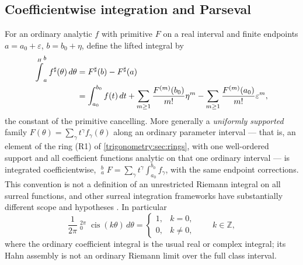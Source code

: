 \documentclass[11pt,letterpaper]{article}
\numberwithin{equation}{section}
\theoremstyle{definition}
\theoremstyle{remark}
\newcommand{\Z}{\mathbb Z}
\newcommand{\eps}{\varepsilon}
\newcommand{\cis}{\operatorname{cis}}
\newcommand{\sh}{^{\sharp}}
\newcommand{\HInt}{\mathop{\overset{\scriptscriptstyle H}{\int}}\nolimits}
\begin{document}
\subsection{Coefficientwise integration and Parseval}
For an ordinary analytic $f$ with primitive $F$ on a real interval and finite endpoints
$a=a_0+\eps$, $b=b_0+\eta$, define the lifted integral by
\begin{align}
 \HInt_a^bf\sh(\theta)\,d\theta
 &=F\sh(b)-F\sh(a)\label{trigonometry:eq:endpointintegral}\\
 &=\int_{a_0}^{b_0}f(t)\,dt
 +\sum_{m\ge1}\frac{F^{(m)}(b_0)}{m!}\eta^m
 -\sum_{m\ge1}\frac{F^{(m)}(a_0)}{m!}\eps^m,\notag
\end{align}
the constant of the primitive cancelling. More generally a \emph{uniformly supported} family
$F(\theta)=\sum_\gamma t^\gamma f_\gamma(\theta)$ along an ordinary parameter interval --- that is,
an element of the ring (R1) of \cref{trigonometry:sec:rings}, with one well-ordered support and all
coefficient functions analytic on that one ordinary interval --- is integrated coefficientwise,
$\HInt_a^bF=\sum_\gamma t^\gamma\int_{a_0}^{b_0}f_\gamma$, with the same endpoint corrections. This
convention is not a definition of an unrestricted Riemann integral on all surreal functions, and
other surreal integration frameworks have substantially different scope and hypotheses \cite{CE}.
In particular
\begin{equation}\label{trigonometry:eq:orthogonality}
 \frac1{2\pi}\HInt_0^{2\pi}\cis(k\theta)\,d\theta=
 \begin{cases}1,&k=0,\\0,&k\ne0,\end{cases}\qquad k\in\Z,
\end{equation}
where the ordinary coefficient integral is the usual real or complex integral; its Hahn assembly is
not an ordinary Riemann limit over the full class interval.
\end{document}
